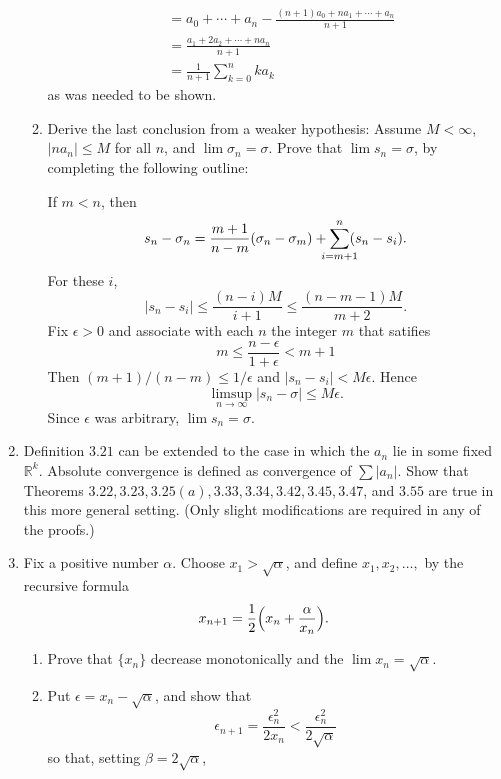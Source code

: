 \begin{enumerate}
\begin{enumerate}[label = (\alph*), ref = \theenumi{} (\alph*)]
\begin{align*}
                     & = a_0 + \cdots + a_n -
                       \frac{(n + 1)a_0 + na_1 + \cdots + a_n}{n + 1}\\
                     & = \frac{a_1 + 2a_2 + \cdots + na_n}{n + 1}\\
                     & = \frac{1}{n + 1}\sum_{k = 0}^nka_k
    \end{align*}
    as was needed to be shown.
  \item
    Derive the last conclusion from a weaker hypothesis: Assume \(M < \infty\),
    \(\lvert na_n\rvert\leq M\) for all \(n\), and \(\lim\sigma_n = \sigma\).
    Prove that \(\lim s_n = \sigma\), by completing the following outline:
    \par\smallskip
    If \(m < n\), then
    \[
    s_n - \sigma_n = \frac{m + 1}{n - m}(\sigma_n - \sigma_m) +
    \smashoperator{\sum_{i = m + 1}^n}(s_n - s_i).
    \]
    For these \(i\),
    \[
    \lvert s_n - s_i\rvert\leq\frac{(n - i)M}{i + 1}\leq
    \frac{(n - m - 1)M}{m + 2}.
    \]
    Fix \(\epsilon > 0\) and associate with each \(n\) the integer \(m\) that
    satifies
    \[
    m\leq\frac{n - \epsilon}{1 + \epsilon} < m + 1
    \]
    Then \((m + 1)/(n - m)\leq 1/\epsilon\) and
    \(\lvert s_n - s_i\rvert < M\epsilon\).
    Hence
    \[
    \limsup_{n\to\infty}\lvert s_n - \sigma\rvert\leq M\epsilon.
    \]
    Since \(\epsilon\) was arbitrary, \(\lim s_n = \sigma\).
  \end{enumerate}
\item
  Definition \(3.21\) can be extended to the case in which the \(a_n\) lie in
  some fixed \(\mathbb{R}^k\).
  Absolute convergence is defined as convergence of \(\sum\lvert a_n\rvert\).
  Show that Theorems \(3.22,3.23,3.25(a),3.33,3.34,3.42,3.45,3.47\), and
  \(3.55\) are true in this more general setting.
  (Only slight modifications are required in any of the proofs.)
\item
  \label{3.16}
  Fix a positive number \(\alpha\).
  Choose \(x_1 > \sqrt{\alpha}\), and define \(x_1,x_2,\ldots,\) by the
  recursive formula
  \[
  x_{n + 1} = \frac{1}{2}\Bigl(x_n + \frac{\alpha}{x_n}\Bigr).
  \]
  \begin{enumerate}[label = (\alph*)]
  \item
    Prove that \(\{x_n\}\) decrease monotonically and the
    \(\lim x_n = \sqrt{\alpha}\).
  \item
    Put \(\epsilon = x_n - \sqrt{\alpha}\), and show that
    \[
    \epsilon_{n + 1} = \frac{\epsilon_n^2}{2x_n} <
    \frac{\epsilon_n^2}{2\sqrt{\alpha}}
    \]
    so that, setting \(\beta = 2\sqrt{\alpha}\),

\end{enumerate}
\end{enumerate}
